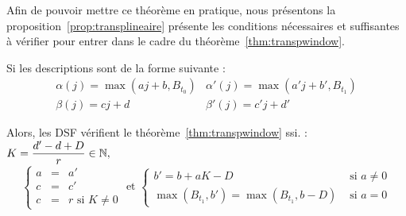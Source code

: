 Afin de pouvoir mettre ce théorème en pratique, nous présentons la proposition~\ref{prop:transplineaire} présente les conditions nécessaires et suffisantes à vérifier pour entrer dans le cadre du théorème~\ref{thm:transpwindow}.
\begin{prop}\label{prop:transplineaire}
    Si les descriptions sont de la forme suivante :
$$\begin{array}{ll} \alpha(j) = \max(aj+b,B_{t_0}) & \alpha'(j) = \max(a'j+b',B_{t_1})\\ \beta(j) = cj+d & \beta'(j) = c'j+d' \end{array}$$

    Alors, les DSF vérifient le théorème~\ref{thm:transpwindow} ssi. :  $K=\dfrac{d'-d+D}r \in \mathbb{N},$
$$\left\{\begin{array}{rcl} a & = & a'\\ c & = & c'\\ c & = & r \textrm{\ si\ } K \neq 0 \end{array}\right.\textrm{ et }\begin{cases} b' = b+aK-D & \textrm{\ si\ } a \neq 0\\ \max(B_{t_1},b') = \max(B_{t_1}, b-D)& \textrm{\ si\ } a=0 \end{cases}$$
\end{prop}

